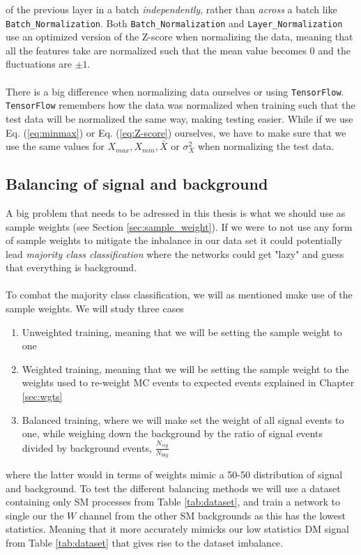 \documentclass[12pt, a4paper]{book}
\begin{document}
of the previous layer in a batch \textit{independently}, rather than \textit{across} a batch like \verb|Batch_Normalization|. Both \verb|Batch_Normalization| and \verb|Layer_Normalization| use an optimized version of the Z-score when normalizing the data, meaning that all the features 
take are normalized such that the mean value becomes 0 and the fluctuations are $\pm1$.\\
\\There is a big difference when normalizing data ourselves or using \verb|TensorFlow|. \verb|TensorFlow| remembers how the data was normalized when training such that the test data will be normalized the same way, making testing easier. While if we use Eq. (\ref{eq:minmax}) or 
Eq. (\ref{eq:Z-score}) ourselves, we have to make sure that we use the same values for $X_{max}, X_{min}, \bar{X}$ or $\sigma_X^2$ when normalizing the test data. 



\subsection{Balancing of signal and background}\label{sec:balance_NN}
A big problem that needs to be adressed in this thesis is what we should use as sample weights (see Section \ref{sec:sample_weight}). If we were to not use any form of sample weights to mitigate the inbalance in our data set it could potentially lead \textit{majority class classification} where the 
networks could get "lazy" and guess that everything is background. \\
\\To combat the majority class classification, we will as mentioned make use of the sample weights. We will study three cases
\begin{enumerate}
   \item Unweighted training, meaning that we will be setting the sample weight to one
   \item Weighted training, meaning that we will be setting the sample weight to the weights used to re-weight MC events to expected events explained in Chapter \ref{sec:wgts}
   \item Balanced training, where we will make set the weight of all signal events to one, while weighing down the background by the ratio of signal events divided by background events, $\frac{N_{sig}}{N_{bkg}}$ 
\end{enumerate}
where the latter would in terms of weights mimic a 50-50 distribution of signal and background. To test the different balancing methods we will use a dataset containing only SM processes from Table \ref{tab:dataset}, and train a network to single our the $W$ channel from the other SM backgrounds as this has the lowest statistics. 
Meaning that it more accurately mimicks our low statistics DM signal from Table \ref{tab:dataset} that gives rise to the dataset imbalance.
\end{document}
